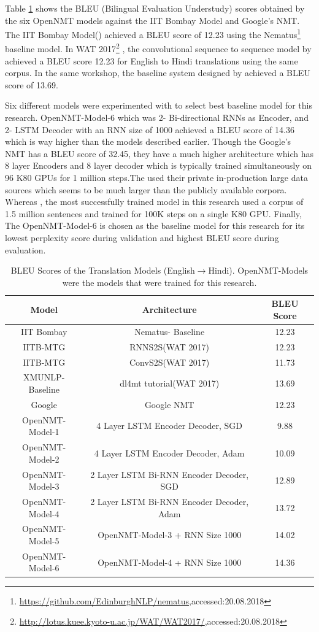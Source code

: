 Table \ref{bleutable1} shows the BLEU (Bilingual Evaluation Understudy) scores obtained by the six OpenNMT models against the IIT Bombay Model and Google's NMT. The IIT Bombay Model(\cite{Kunchukuttan2018TheIB}) achieved a BLEU score of 12.23 using the Nematus\footnote{{\url{https://github.com/EdinburghNLP/nematus},accessed:20.08.2018}} baseline model. In WAT 2017\footnote{{\url{http://lotus.kuee.kyoto-u.ac.jp/WAT/WAT2017/},accessed:20.08.2018}} , the convolutional sequence to sequence model by  \cite{Singh2017ComparingRA} achieved a BLEU score 12.23 for English to Hindi translations using the same corpus. In the same workshop, the baseline system designed by \cite{W17-5707} achieved a BLEU score of 13.69. 

Six different models were experimented with to select best baseline model for this research. OpenNMT-Model-6 which was 2- Bi-directional RNNs as Encoder, and 2- LSTM Decoder with an RNN size of 1000 achieved a BLEU score of 14.36 which is way higher than the models described earlier.  Though the Google's NMT has a BLEU score of 32.45, they have a much higher architecture which has 8 layer Encoders and 8 layer decoder which is typically trained simultaneously on 96 K80 GPUs for 1 million steps.The used their private in-production large data sources which seems to be much larger than the publicly available corpora. Whereas , the most successfully trained model in this research used a corpus of 1.5 million sentences and trained for 100K steps on a single K80 GPU. Finally, The OpenNMT-Model-6 is chosen as the baseline model for this research for its lowest perplexity score during validation and highest BLEU score during evaluation.

\begin{table}[h]
\centering
 \begin{tabular}{ |c|c|c| } 
  \hline Model & Architecture & BLEU Score  \\ 
  \hline  IIT Bombay & Nematus- Baseline & 12.23\\
  \hline  IITB-MTG &  RNNS2S(WAT 2017) & 12.23\\
  IITB-MTG & ConvS2S(WAT 2017) & 11.73\\
   XMUNLP-Baseline &  dl4mt tutorial(WAT 2017) & 13.69\\
  \hline  Google & Google NMT & 12.23\\
  \hline  OpenNMT-Model-1 &  4 Layer LSTM Encoder Decoder, SGD & 9.88\\
  OpenNMT-Model-2 & 4 Layer LSTM Encoder Decoder, Adam & 10.09\\
  OpenNMT-Model-3 & 2 Layer LSTM Bi-RNN Encoder Decoder, SGD & 12.89 \\
  OpenNMT-Model-4 & 2 Layer LSTM Bi-RNN Encoder Decoder, Adam & 13.72 \\
  OpenNMT-Model-5 & OpenNMT-Model-3 + RNN Size 1000 & 14.02 \\
  OpenNMT-Model-6 & OpenNMT-Model-4 + RNN Size 1000 & 14.36 \\
  \hline
 \end{tabular}
\caption{BLEU Scores of the Translation Models (English$\rightarrow$Hindi). OpenNMT-Models were the models that were trained for this research.}
\label{bleutable1}
\end{table}

